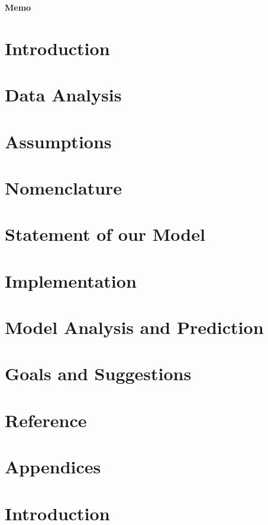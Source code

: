 \documentclass{mcmthesis}
\begin{document}
\maketitle
\noindent\centerline{\LARGE\bfseries Memo}

\newpage
\tableofcontents

\newpage

\section{Introduction}	

\section{Data Analysis}

\section{Assumptions}\label{Sec-Assume}

\section{Nomenclature}\label{Sec-Nomen}

\section{Statement of our Model} \label{Sec-Model}

\section{Implementation} \label{Sec-Implementation}

\section{Model Analysis and Prediction}

\section{Goals and Suggestions}

\section{Reference}

\section{Appendices}
\newpage
\section{Introduction}	
\end{document}

